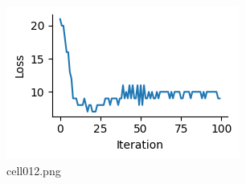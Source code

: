 \begin{figure}[ht]
	\centering
	\includegraphics[scale=0.8, max width=\linewidth]{./fig/local-learning-rule/logistic-regression-perceptron/cell012.png}
	\caption{cell012.png}
	\label{cell012.png}
\end{figure}